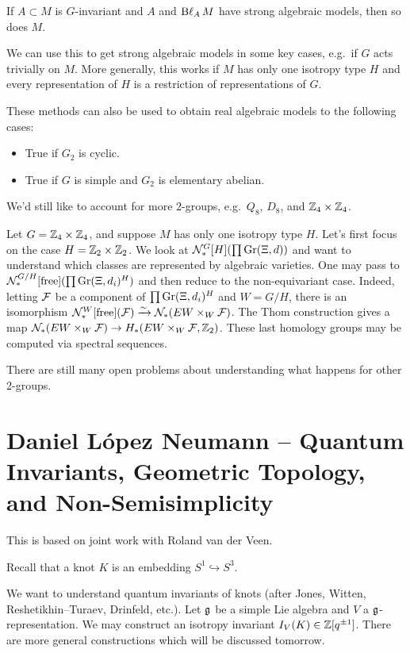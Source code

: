 \documentclass{amsart}
\begin{document}
\begin{thm}
  If $A \subset M$ is $G$-invariant and $A$ and $\operatorname{B\ell}_A M$ have strong algebraic models, then so does $M$.
\end{thm}

We can use this to get strong algebraic models in some key cases, e.g.\ if $G$ acts trivially on $M$.
More generally, this works if $M$ has only one isotropy type $H$ and every representation of $H$ is a restriction of representations of $G$.

These methods can also be used to obtain real algebraic models to the following cases:
\begin{itemize}
  \item True if $G_2$ is cyclic.
  \item True if $G$ is simple and $G_2$ is elementary abelian.
\end{itemize}

We'd still like to account for more $2$-groups, e.g.\ $Q_8$, $D_8$, and $\mathbb{Z}_4 \times \mathbb{Z}_4$.

\begin{ex}
  Let $G = \mathbb{Z}_4 \times \mathbb{Z}_4$, and suppose $M$ has only one isotropy type $H$.
  Let's first focus on the case $H = \mathbb{Z}_2 \times \mathbb{Z}_2$.
  We look at $\mathcal{N}^G_*[H](\prod \operatorname{Gr}(\Xi, d))$ and want to understand which classes are represented by algebraic varieties.
  One may pass to $\mathcal{N}^{G/H}_*[\textrm{free}](\prod \operatorname{Gr}(\Xi, d_i)^H)$ and then reduce to the non-equivariant case.
  Indeed, letting $\mathcal{F}$ be a component of $\prod \operatorname{Gr}(\Xi, d_i)^H$ and $W = G/H$, there is an isomorphism $\mathcal{N}_*^W[\textrm{free}](\mathcal{F}) \xrightarrow{\sim} \mathcal{N}_*(EW \times_W \mathcal{F})$.
  The Thom construction gives a map $\mathcal{N}_*(EW \times_W \mathcal{F}) \to H_*(EW \times_W \mathcal{F}, \mathbb{Z}_2)$.
  These last homology groups may be computed via spectral sequences.
\end{ex}

There are still many open problems about understanding what happens for other 2-groups.

\section{Daniel L\'opez Neumann -- Quantum Invariants, Geometric Topology, and Non-Semisimplicity}

This is based on joint work with Roland van der Veen.

Recall that a knot $K$ is an embedding $S^1 \hookrightarrow S^3$.

We want to understand quantum invariants of knots (after Jones, Witten, Reshetikhin--Turaev, Drinfeld, etc.).
Let $\mathfrak{g}$ be a simple Lie algebra and $V$ a $\mathfrak{g}$-representation.
We may construct an isotropy invariant $I_V(K) \in \mathbb{Z}[q^{\pm 1}]$.
There are more general constructions which will be discussed tomorrow.
\end{document}
